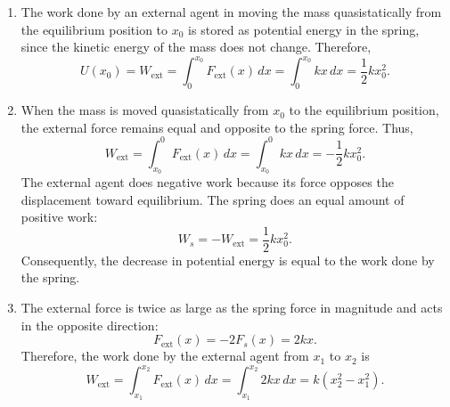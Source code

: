 \documentclass[12pt]{article}
\begin{document}
\begin{enumerate}
    \item[(a)] The work done by an external agent in moving the mass quasistatically from the equilibrium position to $x_0$ is stored as potential energy in the spring, since the kinetic energy of the mass does not change. Therefore,
    \begin{equation}
        U(x_0)=W_{\text{ext}}
        =\int_0^{x_0}F_{\text{ext}}(x)\,dx
        =\int_0^{x_0}kx\,dx
        =\boxed{\frac{1}{2}kx_0^2}.
    \end{equation}

    \item[(b)] When the mass is moved quasistatically from $x_0$ to the equilibrium position, the external force remains equal and opposite to the spring force. Thus,
    \begin{equation}
        W_{\text{ext}}
        =\int_{x_0}^{0}F_{\text{ext}}(x)\,dx
        =\int_{x_0}^{0}kx\,dx
        =\boxed{-\frac{1}{2}kx_0^2}.
    \end{equation}
    The external agent does negative work because its force opposes the displacement toward equilibrium. The spring does an equal amount of positive work:
    \begin{equation}
        W_s=-W_{\text{ext}}=\frac{1}{2}kx_0^2.
    \end{equation}
    Consequently, the decrease in potential energy is equal to the work done by the spring.

    \item[(c)] The external force is twice as large as the spring force in magnitude and acts in the opposite direction:
    \begin{equation}
        F_{\text{ext}}(x)=-2F_s(x)=2kx.
    \end{equation}
    Therefore, the work done by the external agent from $x_1$ to $x_2$ is
    \begin{equation}
        W_{\text{ext}}
        =\int_{x_1}^{x_2}F_{\text{ext}}(x)\,dx
        =\int_{x_1}^{x_2}2kx\,dx
        =\boxed{k(x_2^2-x_1^2)}.
    \end{equation}


\end{enumerate}
\end{document}
